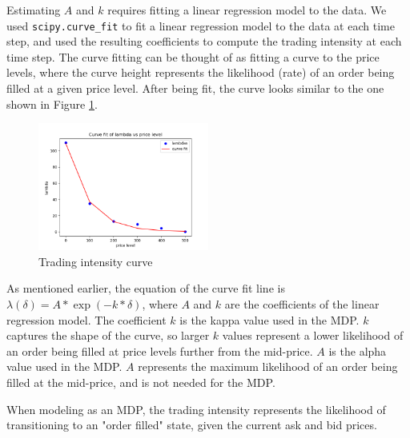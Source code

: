 \documentclass[letterpaper, 10 pt, conference]{ieeeconf}  %
\begin{document}
Estimating $A$ and $k$ requires fitting a linear regression model to the data. We used \texttt{scipy.curve\_fit} to fit a linear regression model to the data at each time step, and used the resulting coefficients to compute the trading intensity at each time step. The curve fitting can be thought of as fitting a curve to the price levels, where the curve height represents the likelihood (rate) of an order being filled at a given price level. After being fit, the curve looks similar to the one shown in Figure \ref{fig:trading_intensity}.
\begin{figure}[h]
        \centering
        \includegraphics[width=0.5\textwidth]{trading_intensity.png}
        \caption{Trading intensity curve}
        \label{fig:trading_intensity}
\end{figure}
As mentioned earlier, the equation of the curve fit line is $\lambda(\delta) = A*\exp(-k*\delta)$, where $A$ and $k$ are the coefficients of the linear regression model. The coefficient $k$ is the kappa value used in the MDP. $k$ captures the shape of the curve, so larger $k$ values represent a lower likelihood of an order being filled at price levels further from the mid-price. $A$ is the alpha value used in the MDP. $A$ represents the maximum likelihood of an order being filled at the mid-price, and is not needed for the MDP. 

When modeling as an MDP, the trading intensity represents the likelihood of transitioning to an "order filled" state, given the current ask and bid prices. 
\end{document}
